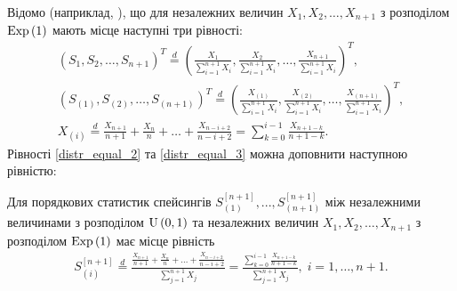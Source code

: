 Відомо (наприклад, \cite{Holst_1980}), що для незалежних величин 
$X_1, X_2, \dots, X_{n+1}$ з розподілом $\mathrm{Exp}\left(1\right)$
мають місце наступні три рівності:
\begin{gather}
    \label{distr_equal_1}
    \left(
        S_1, S_2, \dots, S_{n+1}
    \right)^T
    \overset{d}{=}
    \left(
        \frac{X_1}{\sum_{i=1}^{n+1} X_i},
        \frac{X_2}{\sum_{i=1}^{n+1} X_i},
        \dots,
        \frac{X_{n+1}}{\sum_{i=1}^{n+1} X_i}
    \right)^T, \\
    \label{distr_equal_2}
    \left(
        S_{(1)}, S_{(2)}, \dots, S_{(n+1)}
    \right)^T
    \overset{d}{=}
    \left(
        \frac{X_{(1)}}{\sum_{i=1}^{n+1} X_i},
        \frac{X_{(2)}}{\sum_{i=1}^{n+1} X_i},
        \dots,
        \frac{X_{(n+1)}}{\sum_{i=1}^{n+1} X_i}
    \right)^T, \\
    \label{distr_equal_3}
    X_{(i)} \overset{d}{=}
    \frac{X_{n+1}}{n+1} + \frac{X_{n}}{n} + \dots + \frac{X_{n-i+2}}{n-i+2} = 
    \sum_{k=0}^{i-1} \frac{X_{n+1-k}}{n+1-k}.
\end{gather}
Рівності \eqref{distr_equal_2} та \eqref{distr_equal_3}
можна доповнити наступною рівністю:
\begin{lemma}\label{distr_equal}
    Для порядкових статистик спейсингів 
    $S_{(1)}^{[n+1]}, ..., S_{(n+1)}^{[n+1]}$
    між незалежними величинами з розподілом $\mathrm{U}\left(0, 1\right)$
    та незалежних величин 
    $X_1, X_2, \dots, X_{n+1}$ з розподілом $\mathrm{Exp}\left(1\right)$ має місце
    рівність 
    \begin{gather}\label{distr_equal_4}
        S_{(i)}^{[n+1]} \overset{d}{=}
        \frac{
            \frac{X_{n+1}}{n+1} + \frac{X_{n}}{n} + \dots + \frac{X_{n-i+2}}{n-i+2}
        }{
            \sum_{j=1}^{n+1} X_j
        } = \frac{
            \sum_{k=0}^{i-1} \frac{X_{n+1-k}}{n+1-k}
        }{
            \sum_{j=1}^{n+1} X_j
        }, \; i = 1, \dots, n+1.
    \end{gather}
\end{lemma}
